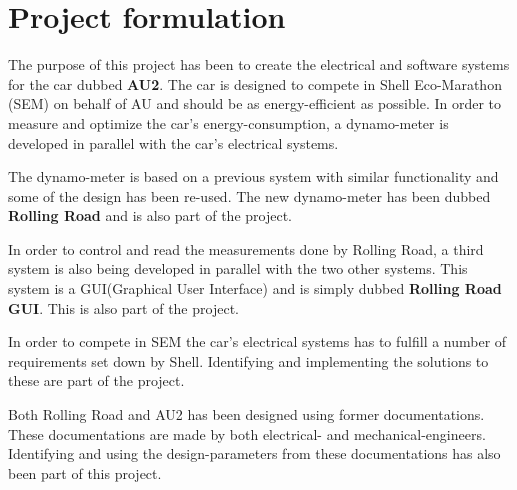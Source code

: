 \chapter{Project formulation}
The purpose of this project has been to create the electrical and software systems for the car dubbed \textbf{AU2}. The car is designed to compete in Shell Eco-Marathon (SEM) on behalf of AU and should be as energy-efficient as possible. In order to measure and optimize the car's energy-consumption, a dynamo-meter is developed in parallel with the car's electrical systems. 

The dynamo-meter is based on a previous system with similar functionality\cite{BAC_rullefelt} and some of the design has been re-used. The new dynamo-meter has been dubbed \textbf{Rolling Road} and is also part of the project.

In order to control and read the measurements done by Rolling Road, a third system is also being developed in parallel with the two other systems. This system is a GUI(Graphical User Interface) and is simply dubbed \textbf{Rolling Road GUI}. This is also part of the project.

In order to compete in SEM the car's electrical systems has to fulfill a number of requirements set down by Shell. Identifying and implementing the solutions to these are part of the project.

Both Rolling Road and AU2 has been designed using former documentations. These documentations are made by both electrical- and mechanical-engineers. Identifying and using the design-parameters from these documentations has also been part of this project.

